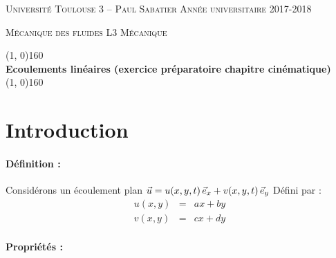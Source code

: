 \documentclass[10pt, a4paper]{article}
\renewcommand{\thickline}[2]{\linethickness{#1} \line(1, 0){#2}}
\renewcommand{\myvec}[1]{\vec{#1}}
\begin{document}

\begin{center}

  \textsc{Université Toulouse 3 -- Paul Sabatier \hfill Année universitaire 2017-2018}
  
  \textsc{Mécanique des fluides \hfill L3 Mécanique}
  
  \vspace{0mm}
  
  \begin{center}
    \thickline{0.4mm}{160}
    \\ \vspace{3mm}
  \textbf{\large Ecoulements linéaires (exercice préparatoire chapitre cinématique)}
    \\ %
    \thickline{0.4mm}{160}
  \end{center}

  
\end{center}

\section{Introduction}

\paragraph{Définition :\\}

Considérons un écoulement plan $\myvec{u} = u(x, y, t) \, \ex + v(x, y, t) \, \ey$ 
Défini par :
\begin{eqnarray}
u(x,y) &=& a x + by\\
v(x,y) &=& cx+dy
\end{eqnarray} 


\paragraph{Propriétés :}
\end{document}
